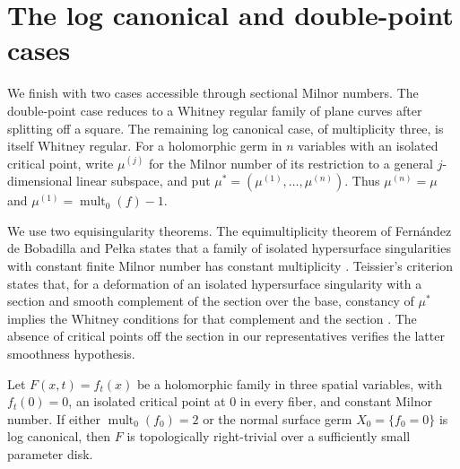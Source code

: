 \section{The log canonical and double-point cases}
\label{sec:low-cases}

We finish with two cases accessible through sectional Milnor numbers.
The double-point case reduces to a Whitney regular family of plane
curves after splitting off a square.  The remaining log canonical case,
of multiplicity three, is itself Whitney regular.
For a holomorphic germ in $n$ variables with
an isolated critical point, write $\mu^{(j)}$ for the Milnor number of its
restriction to a general $j$-dimensional linear subspace, and put
$\mu^*=(\mu^{(1)},\ldots,\mu^{(n)})$.  Thus $\mu^{(n)}=\mu$ and
$\mu^{(1)}=\operatorname{mult}_0(f)-1$.

We use two equisingularity theorems.  The equimultiplicity theorem of
Fern\'andez de Bobadilla and Pe\l ka states that a family of isolated
hypersurface singularities with constant finite Milnor number has constant
multiplicity \cite[Theorem~1.1]{FernandezBobadillaPelka2024}.  Teissier's
criterion states that, for a deformation of an isolated hypersurface
singularity with a section and smooth complement of the section over the
base, constancy of $\mu^*$ implies the Whitney conditions for that
complement and the section \cite[Chapter~II, Theorem~3.9]{Teissier1973}.
The absence of critical points off the section in our representatives
verifies the latter smoothness hypothesis.

\begin{proposition}\label{prop:low-cases}
Let $F(x,t)=f_t(x)$ be a holomorphic family in three spatial variables,
with $f_t(0)=0$, an isolated critical point at $0$ in every fiber, and
constant Milnor number.  If either $\operatorname{mult}_0(f_0)=2$ or the
normal surface germ $X_0=\{f_0=0\}$ is log canonical, then $F$ is
topologically right-trivial over a sufficiently small parameter disk.
\end{proposition}

